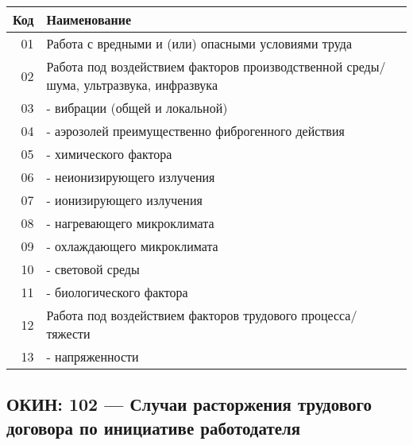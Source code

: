 \documentclass[10pt, a4paper, titlepage]{article}
\begin{document}
\begin{center}
    \begin{tabular}{rp{}}
        \hline
        \textbf{Код} & \textbf{Наименование} \\ \hline
        01 & Работа с вредными и (или) опасными условиями труда \\
        02 & Работа под воздействием факторов производственной среды/шума, ультразвука, инфразвука \\
        03 & - вибрации (общей и локальной) \\
        04 & - аэрозолей преимущественно фиброгенного действия \\
        05 & - химического фактора \\
        06 & - неионизирующего излучения \\
        07 & - ионизирующего излучения \\
        08 & - нагревающего микроклимата \\
        09 & - охлаждающего микроклимата \\
        10 & - световой среды \\
        11 & - биологического фактора \\
        12 & Работа под воздействием факторов трудового процесса/тяжести \\
        13 & - напряженности \\
    \end{tabular}
\end{center}

\subsection{ОКИН: 102 — Случаи расторжения трудового договора по инициативе работодателя}
\end{document}
